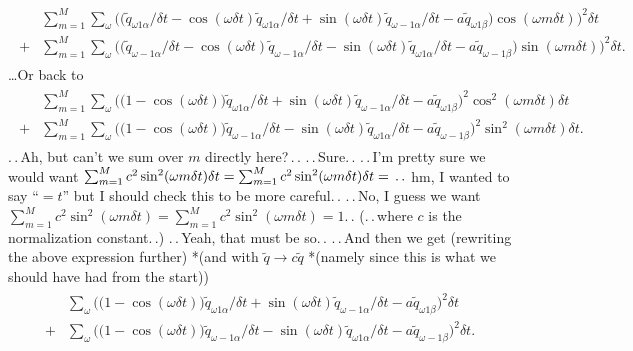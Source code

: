 \documentclass{report}
\begin{document}
\begin{align}
\begin{aligned}
	&\sum_{m=1}^{M} \sum_{\omega}
		\Big( 
			\big(
				\tilde q_{\omega 1\alpha} / \delta t -
				\cos(\omega\delta t) \tilde q_{\omega 1\alpha} / \delta t +
				\sin(\omega\delta t) \tilde q_{\omega-1\alpha} / \delta t -
				a \tilde q_{\omega 1\beta}
			\big)
			\cos(\omega m \delta t) 
		\Big)^2 
		\delta t\\
	+&\sum_{m=1}^{M} \sum_{\omega}
		\Big( 
			\big(
				\tilde q_{\omega-1\alpha} / \delta t -
				\cos(\omega\delta t) \tilde q_{\omega-1\alpha} / \delta t -
				\sin(\omega\delta t) \tilde q_{\omega 1\alpha} / \delta t -
				a \tilde q_{\omega-1\beta}
			\big)
			\sin(\omega m \delta t) 
		\Big)^2 
		\delta t.
\end{aligned}
\end{align}
\ldots Or back to
\begin{align}
\begin{aligned}
	&\sum_{m=1}^{M} \sum_{\omega}
		\Big(
			\big(1 - \cos(\omega\delta t)\big) \tilde q_{\omega 1\alpha}  / \delta t +
			\sin(\omega\delta t) \tilde q_{\omega-1\alpha} / \delta t -
			a \tilde q_{\omega 1\beta}
		\Big)^2 
		\cos^2(\omega m \delta t)
		\delta t\\
	+&\sum_{m=1}^{M} \sum_{\omega}
		\Big(
			\big(1 - \cos(\omega\delta t)\big) \tilde q_{\omega-1\alpha}  / \delta t -
			\sin(\omega\delta t) \tilde q_{\omega 1\alpha} / \delta t -
			a \tilde q_{\omega-1\beta}
		\Big)^2 
		\sin^2(\omega m \delta t)
		\delta t.
\end{aligned}
\end{align}
.\,.\,Ah, but can't we sum over $m$ directly here?\,.\,. .\,.\,Sure.\,. .\,.\,I'm pretty sure we would want $\sum_{m=1}^{M} c^2 \sin^2(\omega m \\\delta t) \delta t = \sum_{m=1}^{M} c^2 \sin^2(\omega m \delta t) \delta t = \,.\,.$ hm, I wanted to say ``$=t$'' but I should check this to be more careful.\,. .\,.\,No, I guess we want $\sum_{m=1}^{M} c^2 \sin^2(\omega m \delta t) = \sum_{m=1}^{M} c^2 \sin^2(\omega m \delta t) = 1$.\,. (.\,.\,where $c$ is the normalization constant.\,.) .\,.\,Yeah, that must be so.\,. .\,.\,And then we get (rewriting the above expression further) *(and with $\tilde q \to c \tilde q$ *(namely since this is what we should have had from the start))
\begin{align}
\begin{aligned}
	&\sum_{\omega}
		\Big(
			\big(1 - \cos(\omega\delta t)\big) \tilde q_{\omega 1\alpha}  / \delta t +
			\sin(\omega\delta t) \tilde q_{\omega-1\alpha} / \delta t -
			a \tilde q_{\omega 1\beta}
		\Big)^2 
		\delta t\\
	+&\sum_{\omega}
		\Big(
			\big(1 - \cos(\omega\delta t)\big) \tilde q_{\omega-1\alpha}  / \delta t -
			\sin(\omega\delta t) \tilde q_{\omega 1\alpha} / \delta t -
			a \tilde q_{\omega-1\beta}
		\Big)^2 
		\delta t.
	\label{eq_3.51}
\end{aligned}
\end{align}
\end{document}
